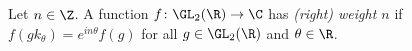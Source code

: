 Let $n\in\Z$. A function $f\colon\GL_2(\R)\to\C$ has \emph{(right) weight $n$} if
$f(gk_\theta)=e^{in\theta}f(g)$ for all $g\in\GL_2(\R)$ and $\theta\in\R$.
